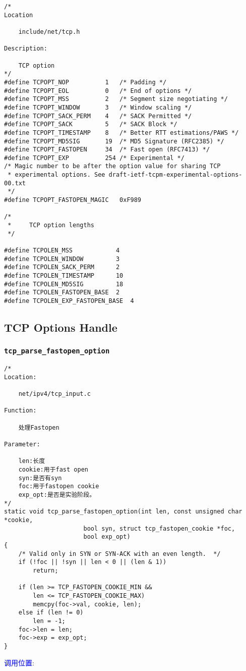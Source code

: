 \begin{verbatim}
/*
Location

    include/net/tcp.h
    
Description:
    
    TCP option
*/
#define TCPOPT_NOP          1   /* Padding */
#define TCPOPT_EOL          0   /* End of options */
#define TCPOPT_MSS          2   /* Segment size negotiating */
#define TCPOPT_WINDOW       3   /* Window scaling */
#define TCPOPT_SACK_PERM    4   /* SACK Permitted */
#define TCPOPT_SACK         5   /* SACK Block */
#define TCPOPT_TIMESTAMP    8   /* Better RTT estimations/PAWS */
#define TCPOPT_MD5SIG       19  /* MD5 Signature (RFC2385) */
#define TCPOPT_FASTOPEN     34  /* Fast open (RFC7413) */
#define TCPOPT_EXP          254 /* Experimental */
/* Magic number to be after the option value for sharing TCP
 * experimental options. See draft-ietf-tcpm-experimental-options-00.txt
 */
#define TCPOPT_FASTOPEN_MAGIC   0xF989

/*
 *     TCP option lengths
 */

#define TCPOLEN_MSS            4
#define TCPOLEN_WINDOW         3
#define TCPOLEN_SACK_PERM      2
#define TCPOLEN_TIMESTAMP      10
#define TCPOLEN_MD5SIG         18
#define TCPOLEN_FASTOPEN_BASE  2
#define TCPOLEN_EXP_FASTOPEN_BASE  4
\end{verbatim}

	\subsection{TCP Options Handle}        
        \subsubsection{\texttt{tcp_parse_fastopen_option}}
            \label{TCPOptions:tcp_parse_fastopen_option}
\begin{verbatim}
/*
Location:

    net/ipv4/tcp_input.c

Function:

    处理Fastopen

Parameter:

    len:长度
    cookie:用于fast open
    syn:是否有syn
    foc:用于fastopen cookie
    exp_opt:是否是实验阶段。
*/
static void tcp_parse_fastopen_option(int len, const unsigned char *cookie,
                      bool syn, struct tcp_fastopen_cookie *foc,
                      bool exp_opt)
{
    /* Valid only in SYN or SYN-ACK with an even length.  */
    if (!foc || !syn || len < 0 || (len & 1))
        return;

    if (len >= TCP_FASTOPEN_COOKIE_MIN &&
        len <= TCP_FASTOPEN_COOKIE_MAX)
        memcpy(foc->val, cookie, len);
    else if (len != 0)
        len = -1;
    foc->len = len;
    foc->exp = exp_opt;
}
\end{verbatim}
        \textcolor{blue}{调用位置}:

